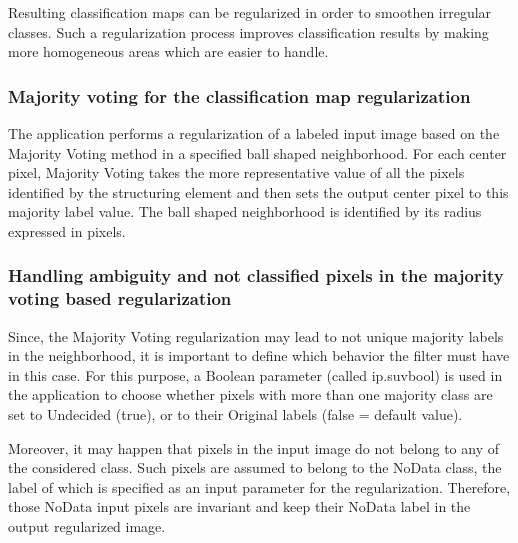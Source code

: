Resulting classification maps can be regularized in order to smoothen irregular classes. Such a regularization process
improves classification results by making more homogeneous areas which are easier to handle.

\subsubsection{Majority voting for the classification map regularization}

The  application performs a regularization of a labeled input image
based on the Majority Voting method in a specified ball shaped neighborhood. For each center pixel, Majority Voting takes the
more representative value of all the pixels identified by the structuring element and then sets the output center pixel
to this majority label value. The ball shaped neighborhood is identified by its radius expressed in pixels.


\subsubsection{Handling ambiguity and not classified pixels in the majority voting based regularization}

Since, the Majority Voting regularization may lead to not unique majority labels in the neighborhood, it is important to define
which behavior the filter must have in this case. For this purpose, a Boolean parameter (called ip.suvbool) is used in the
 application to choose whether pixels with more than one majority class are set to
Undecided (true), or to their Original labels (false = default value).

Moreover, it may happen that pixels in the input image do not belong to any of the considered class. Such pixels are
assumed to belong to the NoData class, the label of which is specified as an input parameter for the regularization. Therefore,
those NoData input pixels are invariant and keep their NoData label in the output regularized image.
 
